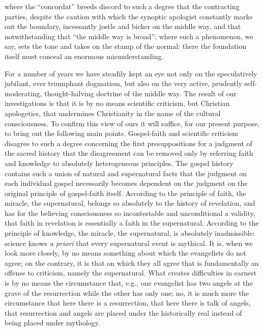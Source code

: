 \documentclass[12pt]{book}
\newcommand{\opage}[1]{\marginnote{\footnotesize\textit{[#1]}}}
\begin{document}
\opage{54}\setcounter{footnote}{0}%
where the ``concordat'' breeds discord to such a degree that the contracting parties, despite the caution with which the synoptic apologist constantly marks out the boundary, incessantly jostle and bicker on the middle way, and that notwithstanding that ``the middle way is broad''; where such a phenomenon, we say, sets the tone and takes on the stamp of the normal: there the foundation itself must conceal an enormous misunderstanding.

For a number of years we have steadily kept an eye not only on the speculatively jubilant, ever triumphant dogmatism, but also on the very active, prudently self-moderating, thought-halving doctrine of the middle way. The result of our investigations is that it is by no means scientific criticism, but Christian apologetics, that undermines Christianity in the name of the cultural consciousness. To confirm this view of ours it will suffice, for our present purpose, to bring out the following main points. Gospel-faith and scientific criticism disagree to such a degree concerning the first presuppositions for a judgment of the sacred history that the disagreement can be removed only by referring faith and knowledge to absolutely heterogeneous principles. The gospel history contains such a union of natural and supernatural facts that the judgment on each individual gospel necessarily becomes dependent on the judgment on the original principle of gospel-faith itself. According to the principle of faith, the miracle, the supernatural, belongs so absolutely to the history of revelation, and has for the believing consciousness so incontestable and unconditional a validity, that faith in revelation is essentially a faith in the supernatural. According to the principle of knowledge, the miracle, the supernatural, is absolutely inadmissible: science knows \textit{a priori} that every supernatural event is mythical. It is, when we look more closely, by no means something about which the evangelists do not agree; on the contrary, it is that on which they all agree that is fundamentally an offense
\opage{55}\setcounter{footnote}{0}%
to criticism, namely the supernatural. What creates difficulties in earnest is by no means the circumstance that, e.g., one evangelist has two angels at the grave of the resurrection while the other has only one; no, it is much more the circumstance that here there is a resurrection, that here there is talk of angels, that resurrection and angels are placed under the historically real instead of being placed under mythology.
\end{document}
